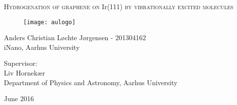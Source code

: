 
\begin{titlingpage}

\begin{center}

\vspace*{0cm}
\huge
\textsc{Hydrogenation of graphene on I}r\textsc{(111) by vibrationally excited molecules}\\
\vspace{1.5cm}

\vspace{3cm}
\begin{figure}[H]
  \centering
\texttt{[image: aulogo]}
\end{figure}
\vspace{1cm}
\vspace{5cm}

\large
{
    Anders Christian Løchte Jørgensen - 201304162\\
    iNano, Aarhus University
}

\vspace{1.5cm}

{
  Supervisor:\\
  Liv Hornekær\\
  Department of Physics and Astronomy, Aarhus University
}

{June 2016}\\


\end{center}



\end{titlingpage}
